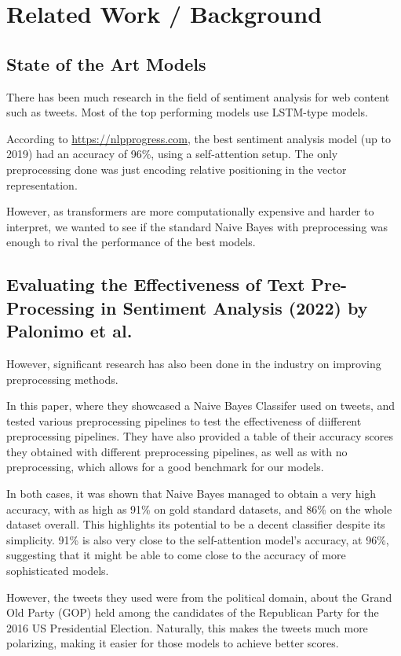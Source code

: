 \documentclass[11pt]{article}
\begin{document}
\section{Related Work / Background}

\subsection{State of the Art Models}

There has been much research in the field of sentiment analysis for web content such as tweets. Most of the top performing models use LSTM-type models\citep{ruder-2026}. 

According to \url{https://nlpprogress.com}, the best sentiment analysis model (up to 2019)\citep{yang-2019} had an accuracy of 96\%, using a self-attention setup. The only preprocessing done was just encoding relative positioning in the vector representation.

However, as transformers are more computationally expensive and harder to interpret, we wanted to see if the standard Naive Bayes with preprocessing was enough to rival the performance of the best models.

\subsection{Evaluating the Effectiveness of Text Pre-Processing in Sentiment Analysis (2022) by Palonimo et al.}

However, significant research has also been done in the industry on improving preprocessing methods.

In this paper\citep{palomino-2022}, where they showcased a Naive Bayes Classifer used on tweets, and tested various preprocessing pipelines to test the effectiveness of diifferent preprocessing pipelines. They have also provided a table of their accuracy scores they obtained with different preprocessing pipelines, as well as with no preprocessing, which allows for a good benchmark for our models.

In both cases, it was shown that Naive Bayes managed to obtain a very high accuracy, with as high as 91\% on gold standard datasets, and 86\% on the whole dataset overall. This highlights its potential to be a decent classifier despite its simplicity. 91\% is also very close to the self-attention model's accuracy, at 96\%, suggesting that it might be able to come close to the accuracy of more sophisticated models.

However, the tweets they used were from the political domain, about the Grand Old Party (GOP) held among the candidates of the Republican Party for the 2016 US Presidential Election. Naturally, this makes the tweets much more polarizing, making it easier for those models to achieve better scores.
\end{document}
